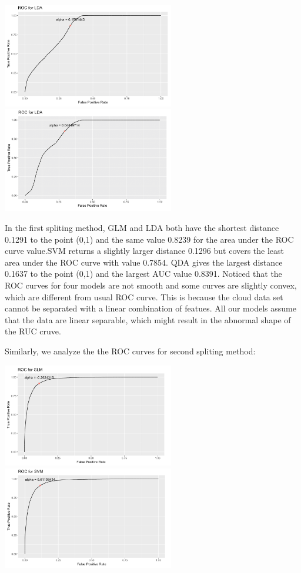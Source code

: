 \documentclass[11pt]{article}
\begin{document}
\includegraphics[width = 7.5cm]{3(b)1-3}
\includegraphics[width = 7.5cm]{3(b)1-4}

In the first spliting method, GLM and LDA both have the shortest distance 0.1291 to the point (0,1) and the same value 0.8239 for the area under the ROC curve value.SVM returns a slightly larger distance 0.1296 but covers the least area under the ROC curve with value 0.7854. QDA gives the largest distance 0.1637 to the point (0,1) and the largest AUC value 0.8391. Noticed that the ROC curves for four models are not smooth and some curves are slightly convex, which are different from usual ROC curve. This is because the cloud data set cannot be separated with a linear combination of featues. All our models assume that the data are linear separable, which might result in the abnormal shape of the RUC cruve.  

Similarly, we analyze the the ROC curves for second spliting method:

\includegraphics[width = 7.5cm]{3(b)2-1}
\includegraphics[width = 7.5cm]{3(b)2-2}
\end{document}
